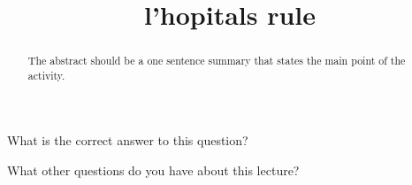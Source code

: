 \documentclass{ximera}
\title{l'hopitals rule}
\begin{document}
\begin{abstract}
  The abstract should be a one sentence summary that states the main point of the activity.
\end{abstract}

\maketitle

\begin{question}
  What is the correct answer to this question?

  \begin{solution}
    \begin{multiple-choice}
    \end{multiple-choice}  
  \end{solution}
\end{question}

What other questions do you have about this lecture?
\begin{free-response}
\end{free-response}
\end{document}
